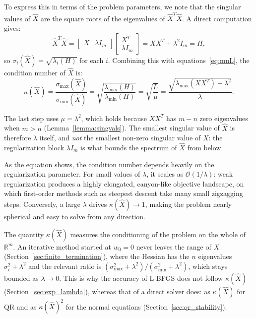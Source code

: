 \noindent To express this in terms of the problem parameters, we note that the
singular values of $\hat{X}$ are the square roots of the eigenvalues of
$\hat{X}^T\hat{X}$. A direct computation gives:
\begin{equation}
\label{eq:Xhat_gram}
    \hat{X}^T\hat{X}
    = \begin{bmatrix} X & \lambda I_m \end{bmatrix}
      \begin{bmatrix} X^T \\ \lambda I_m \end{bmatrix}
    = XX^T + \lambda^2 I_m = H,
\end{equation}
so $\sigma_i(\hat{X}) = \sqrt{\lambda_i(H)}$ for each $i$. Combining this with
equations~\eqref{eq:muL}, the condition number of $\hat{X}$ is:
\begin{equation}
\label{eq:condition}
    \kappa(\hat{X})
    = \frac{\sigma_{\max}(\hat{X})}{\sigma_{\min}(\hat{X})}
    = \sqrt{\frac{\lambda_{\max}(H)}{\lambda_{\min}(H)}}
    = \sqrt{\frac{L}{\mu}}
    = \frac{\sqrt{\lambda_{\max}(XX^T) + \lambda^2}}{\lambda}.
\end{equation}

\noindent The last step uses $\mu = \lambda^2$, which holds because $XX^T$ has
$m - n$ zero eigenvalues when $m > n$ (Lemma~\ref{lemma:singvals}). The
smallest singular value of $\hat{X}$ is therefore $\lambda$ itself, and
\emph{not} the smallest non-zero singular value of $X$: the regularization
block $\lambda I_m$ is what bounds the spectrum of $\hat X$ from below.

\noindent As the equation shows, the condition number depends heavily on the
regularization parameter. For small values of $\lambda$, it scales as
$\mathcal{O}(1/\lambda)$: weak regularization produces a highly elongated,
canyon-like objective landscape, on which first-order methods such as
steepest descent take many small zigzagging steps. Conversely, a large $\lambda$ drives $\kappa(\hat{X}) \to 1$,
making the problem nearly spherical and easy to solve from any direction.

\noindent The quantity $\kappa(\hat X)$ measures the conditioning of the
problem on the whole of $\mathbb{R}^m$. An iterative method started at
$w_0 = 0$ never leaves the range of $X$ (Section~\ref{sec:finite_termination}),
where the Hessian has the $n$ eigenvalues $\sigma_i^2 + \lambda^2$ and the
relevant ratio is $(\sigma_{\max}^2 + \lambda^2)/(\sigma_{\min}^2 + \lambda^2)$,
which stays bounded as $\lambda \to 0$. This is why the accuracy of L-BFGS does
not follow $\kappa(\hat X)$ (Section~\ref{sec:exp_lambda}), whereas that of a direct solver does: as $\kappa(\hat X)$ for QR and as
$\kappa(\hat X)^2$ for the normal equations (Section~\ref{sec:qr_stability}).
